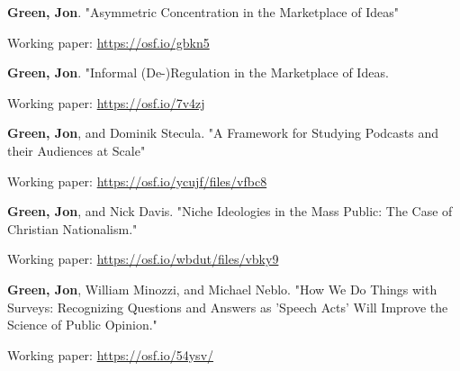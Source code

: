 \documentclass[letterpaper]{article}
\renewenvironment{itemize}{
  \begin{list}{}{
    \setlength{\leftmargin}{1.5em}
  }
}{
  \end{list}
}
\begin{document}
\begin{itemize}

\item \textbf{Green, Jon}. "Asymmetric Concentration in the Marketplace of Ideas"
\begin{itemize}
\item Working paper: \url{https://osf.io/gbkn5}
\end{itemize}

\item \textbf{Green, Jon}. "Informal (De-)Regulation in the Marketplace of Ideas.
\begin{itemize}
\item Working paper: \url{https://osf.io/7v4zj}
\end{itemize}

\item \textbf{Green, Jon}, and Dominik Stecula. "A Framework for Studying Podcasts and their Audiences at Scale"
\begin{itemize}
\item Working paper: \url{https://osf.io/ycujf/files/vfbc8}
\end{itemize}

\item \textbf{Green, Jon}, and Nick Davis. "Niche Ideologies in the Mass Public: The Case of Christian Nationalism."
\begin{itemize}
\item Working paper: \url{https://osf.io/wbdut/files/vbky9}
\end{itemize}

\item \textbf{Green, Jon}, William Minozzi, and Michael Neblo. "How We Do Things with Surveys: Recognizing Questions and Answers as 'Speech Acts' Will Improve the Science of Public Opinion." 
\begin{itemize}
\item Working paper: \url{https://osf.io/54ysv/}
\end{itemize}



\end{itemize}
\end{document}
